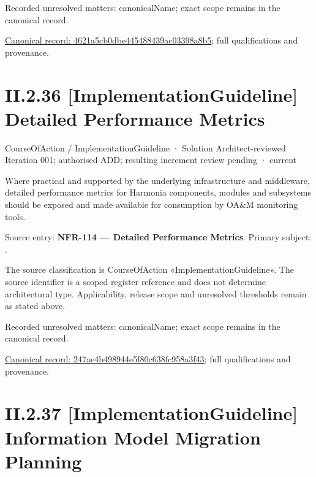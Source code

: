 {\small Recorded unresolved matters: canonicalName; exact scope remains in the canonical record.}\par
{\footnotesize \href{../../../../continuum/strategy/course-of-action/implementation-guideline/4621a5cb0dbe445488439ac03398a8b5.md}{Canonical record: 4621a5cb0dbe445488439ac03398a8b5}; full qualifications and provenance.}\par
\section*{II.2.36 [ImplementationGuideline] Detailed Performance Metrics}
\label{navigation:II.2.36}

\label{element:247ae4b498944e5f80c638fc958a3f43}
{\small CourseOfAction / ImplementationGuideline · Solution Architect-reviewed Iteration 001; authorised ADD; resulting increment review pending · current}\par

Where practical and supported by the underlying infrastructure and middleware, detailed performance metrics for Harmonia components, modules and subsystems should be exposed and made available for consumption by OA\&M monitoring tools.



Source entry: \textbf{NFR-114 — Detailed Performance Metrics}. Primary subject: \texttt{}.



The source classification is CourseOfAction «ImplementationGuideline». The source identifier is a scoped register reference and does not determine architectural type. Applicability, release scope and unresolved thresholds remain as stated above.


{\small Recorded unresolved matters: canonicalName; exact scope remains in the canonical record.}\par
{\footnotesize \href{../../../../continuum/strategy/course-of-action/implementation-guideline/247ae4b498944e5f80c638fc958a3f43.md}{Canonical record: 247ae4b498944e5f80c638fc958a3f43}; full qualifications and provenance.}\par
\section*{II.2.37 [ImplementationGuideline] Information Model Migration Planning}
\label{navigation:II.2.37}

